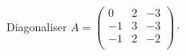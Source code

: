 \documentclass[french,11pt,twoside]{VcCours}
\begin{document}
\begin{Exemple}{} Diagonaliser $A = \begin{pmatrix}
0& 2 & -3 \\
-1 & 3 & -3 \\
-1 & 2 & -2 \\
\end{pmatrix} \cdot$
%

\end{Exemple}
\end{document}
